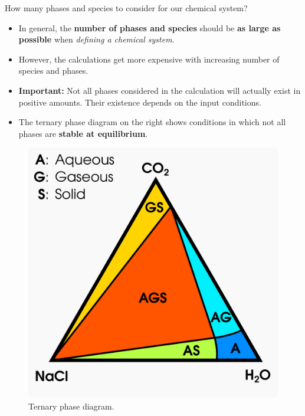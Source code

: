 \begin{frame}{How many phases and species to consider for our chemical system?}

\lcol

\small
\begin{itemize}[<+->]
\item In general, the \textbf{number of phases and species} should be \textbf{as
large as possible} when \emph{defining a chemical system}.
\item However, the calculations get more expensive with increasing number
of species and phases.
\item \textbf{\alert{\textbf{Important:}}} Not all phases considered in
the calculation will actually exist in positive amounts. Their existence
depends on the input conditions.
\item The ternary phase diagram on the right shows conditions in which not
all phases are \textbf{stable at equilibrium}.
\end{itemize}
\rcol
\begin{figure}
\centering
\includegraphics[width=0.9\columnwidth]{figures/applications/ternary-phase-diagram-h2o-co2-nacl}
\caption*{Ternary phase diagram.}
\end{figure}

\ecol
\end{frame}
%
